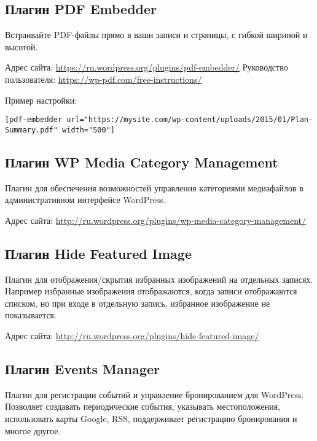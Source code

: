 \subsection{Плагин PDF Embedder}
\label{sec:plugin_pdf_embedder}

Встраивайте PDF-файлы прямо в ваши записи и страницы, с гибкой шириной и высотой.

Адрес сайта: \url{https://ru.wordpress.org/plugins/pdf-embedder/}
Руководство пользователя: \url{https://wp-pdf.com/free-instructions/}

Пример настройки:
\small
\begin{lstlisting}[frame=single, breaklines=true]
[pdf-embedder url="https://mysite.com/wp-content/uploads/2015/01/Plan-Summary.pdf" width="500"]
\end{lstlisting}
\normalsize

\subsection{Плагин WP Media Category Management}
\label{sec:plugin_wp_media_category_management}

Плагин для обеспечения возможностей управления категориями медиафайлов в административном интерфейсе WordPress.

Адрес сайта: \url{http://ru.wordpress.org/plugins/wp-media-category-management/}

\subsection{Плагин Hide Featured Image}
\label{sec:plugin_hide_featured_image}

Плагин для отображения/скрытия избранных изображений на отдельных записях. Например избранные изображения отображаются, когда записи отображаются списком, но при входе в отдельную запись, избранное изображение не показывается.

Адрес сайта: \url{http://ru.wordpress.org/plugins/hide-featured-image/}

\subsection{Плагин Events Manager}
\label{sec:plugin_events_manager}

Плагин для регистрации событий и управление бронированием для WordPress. Позволяет создавать периодические события, указывать местоположения, использовать карты Google, RSS, поддерживает регистрацию бронирования и многое другое.

